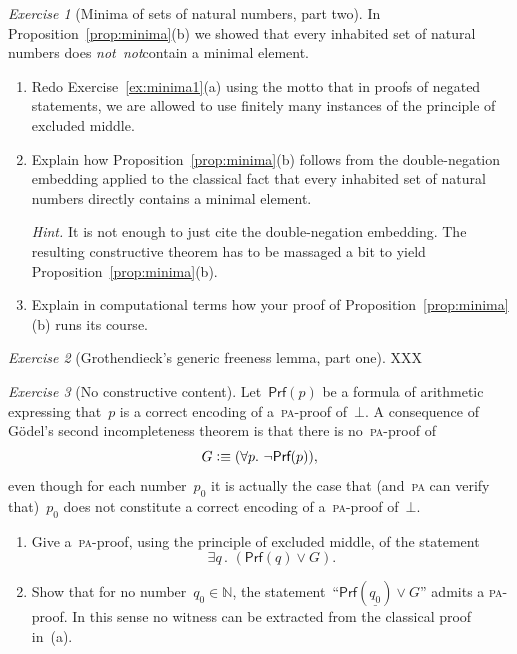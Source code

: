 \documentclass[10pt,reqno,a4paper,openany]{amsbook}
\theoremstyle{definition}
\theoremstyle{plain}
\theoremstyle{remark}
\newcommand{\NN}{\mathbb{N}}
\newcommand{\?}{\,{:}\,}
\renewcommand{\_}{\mathpunct{.}\,}
\newcommand{\defequiv}{\vcentcolon\equiv}
\newtheorem{exercise}{Exercise}[chapter]
\newcommand{\notnot}{\emph{not~not}}
\begin{document}
\begin{exercise}[Minima of sets of natural numbers, part two]
In Proposition~\ref{prop:minima}(b) we showed that every inhabited set of natural
numbers does \notnot contain a minimal element.
\begin{enumerate}
\item Redo Exercise~\ref{ex:minima1}(a) using the motto that in proofs of
negated statements, we are allowed to use finitely many instances of the
principle of excluded middle.
\item Explain how Proposition~\ref{prop:minima}(b) follows
from the double-negation embedding applied to the classical fact that every
inhabited set of natural numbers directly contains a minimal element.

{\noindent\scriptsize\emph{Hint.} It is not enough to just cite the
double-negation embedding. The resulting constructive theorem has to be
massaged a bit to yield Proposition~\ref{prop:minima}(b).\par}
\item Explain in computational terms how your proof of
Proposition~\ref{prop:minima}(b) runs its course.
\end{enumerate}
\end{exercise}

\begin{exercise}[Grothendieck's generic freeness lemma, part one]
XXX
\end{exercise}

\begin{exercise}[No constructive content]\label{ex:no-constructive-content}
Let~$\textsf{Prf}(p)$ be a formula of arithmetic expressing that~$p$ is a
correct encoding of a~\textsc{pa}-proof of~$\bot$. A consequence of Gödel's
second incompleteness theorem is that there is no~\textsc{pa}-proof of
\[ G \defequiv (\forall p\_ \neg\textsf{Prf}(p)), \]
even though for each number~$p_0$ it is actually the case that (and~\textsc{pa}
can verify that)~$p_0$ does not constitute a correct encoding of
a~\textsc{pa}-proof of~$\bot$.
\begin{enumerate}
\item Give a~\textsc{pa}-proof, using the principle of excluded middle, of the
statement
\[ \exists q\_ (\textsf{Prf}(q) \vee G). \]
\item Show that for no number~$q_0 \in \NN$, the
statement~``$\textsf{Prf}(\underline{q_0})
\vee G$'' admits a \textsc{pa}-proof. In this sense no witness can be
extracted from the classical proof in~(a).
\end{enumerate}
\end{exercise}
\end{document}
